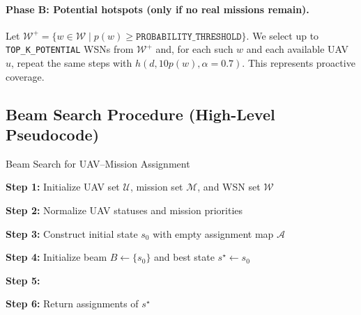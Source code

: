 \paragraph{Phase B: Potential hotspots (only if no real missions remain).}
Let \(\mathcal{W}^+ = \{ w\in\mathcal{W}\mid p(w)\ge\texttt{PROBABILITY\_THRESHOLD}\}\).
We select up to \texttt{TOP\_K\_POTENTIAL} WSNs from \(\mathcal{W}^+\) and, for each such \(w\) and
each available UAV \(u\), repeat the same steps with \(h(d, 10p(w), \alpha{=}0.7)\).
This represents proactive coverage.


\subsection*{Beam Search Procedure (High-Level Pseudocode)}

\begin{algorithm}[H]
    \caption{Beam Search for UAV--Mission Assignment}
    \label{alg:beam_search}
    
    \textbf{Step 1:} Initialize UAV set $\mathcal{U}$, mission set $\mathcal{M}$, and WSN set $\mathcal{W}$\;
    
    \textbf{Step 2:} Normalize UAV statuses and mission priorities\;
    
    \textbf{Step 3:} Construct initial state $s_0$ with empty assignment map $\mathcal{A}$\;
    
    \textbf{Step 4:} Initialize beam $B \leftarrow \{s_0\}$ and best state $s^\star \leftarrow s_0$\;
    
    \textbf{Step 5:} 
    
    \textbf{Step 6:} Return assignments of $s^\star$\;
\end{algorithm}


